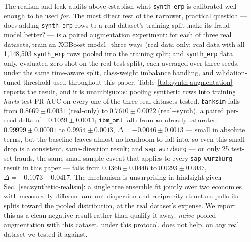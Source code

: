 The realism and leak audits above establish what \texttt{synth\_erp} is
calibrated well enough to be used \emph{for}. The most direct test of the
narrower, practical question — does adding \texttt{synth\_erp} rows to a real
dataset's training split make its fraud model better? — is a paired
augmentation experiment: for each of three real datasets, train an XGBoost
model~\cite{chen2016xgboost} three ways (real data only; real data with all
1{,}148{,}503 \texttt{synth\_erp} rows pooled into the training split; and
\texttt{synth\_erp} data only, evaluated zero-shot on the real test split),
each averaged over three seeds, under the same time-aware split, class-weight
imbalance handling, and validation-tuned threshold used throughout this paper.
Table~\ref{tab:synth-augmentation} reports the result, and it is unambiguous:
pooling synthetic rows into training \emph{hurts} test PR-AUC on every one of
the three real datasets tested. \texttt{banksim} falls from
$0.8669\pm0.0031$ (real-only) to $0.7610\pm0.0022$ (real+synth), a paired
per-seed delta of $-0.1059\pm0.0011$; \texttt{ibm\_aml} falls from an
already-saturated $0.99999\pm0.00001$ to $0.9954\pm0.0013$,
$\Delta=-0.0046\pm0.0013$ — small in absolute terms, but the baseline leaves
almost no headroom to fall into, so even this small drop is a consistent,
same-direction result; and \texttt{sap\_wurzburg} — on only 25 test-set
frauds, the same small-sample caveat that applies to every
\texttt{sap\_wurzburg} result in this paper — falls from $0.1366\pm0.0446$ to
$0.0293\pm0.0033$, $\Delta=-0.1073\pm0.0417$.
The mechanism is unsurprising in hindsight given Sec.~\ref{sec:synthetic-realism}:
a single tree ensemble fit jointly over two economies with measurably
different amount dispersion and reciprocity structure pulls its splits toward
the pooled distribution, at the real dataset's expense. We report this as a
clean negative result rather than qualify it away: \emph{naive} pooled
augmentation with this dataset, under this protocol, does not help, on any
real dataset we tested it against.

\begin{table}[t]
\centering
\small
\caption{Augmentation transfer probe: XGBoost PR-AUC, 3-seed mean $\pm$ std. \texttt{synth\_only} is zero-shot (trained solely on \texttt{synth\_erp}, evaluated on the real test split). Source: \texttt{augmentation.json}.}
\label{tab:synth-augmentation}
\end{table}

